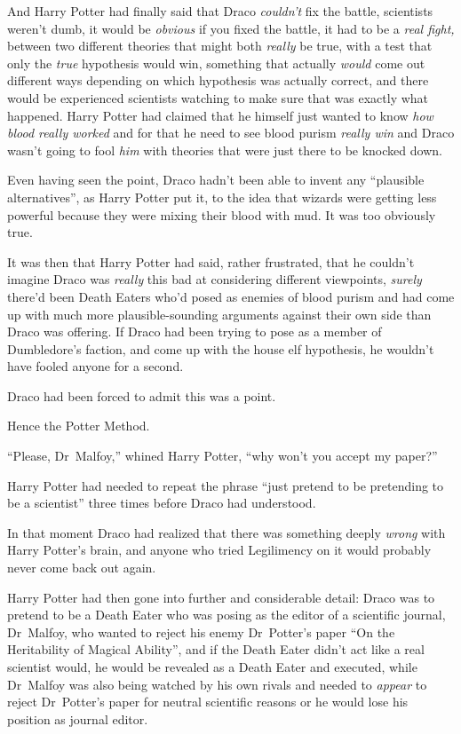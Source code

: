 And Harry Potter had finally said that Draco \emph{couldn’t} fix the battle, scientists weren’t dumb, it would be \emph{obvious} if you fixed the battle, it had to be a \emph{real fight,} between two different theories that might both \emph{really} be true, with a test that only the \emph{true} hypothesis would win, something that actually \emph{would} come out different ways depending on which hypothesis was actually correct, and there would be experienced scientists watching to make sure that was exactly what happened. Harry Potter had claimed that he himself just wanted to know \emph{how blood really worked} and for that he need to see blood purism \emph{really win} and Draco wasn’t going to fool \emph{him} with theories that were just there to be knocked down.

Even having seen the point, Draco hadn’t been able to invent any “plausible alternatives”, as Harry Potter put it, to the idea that wizards were getting less powerful because they were mixing their blood with mud. It was too obviously true.

It was then that Harry Potter had said, rather frustrated, that he couldn’t imagine Draco was \emph{really} this bad at considering different viewpoints, \emph{surely} there’d been Death Eaters who’d posed as enemies of blood purism and had come up with much more plausible-sounding arguments against their own side than Draco was offering. If Draco had been trying to pose as a member of Dumbledore’s faction, and come up with the house elf hypothesis, he wouldn’t have fooled anyone for a second.

Draco had been forced to admit this was a point.

Hence the Potter Method.

“Please, Dr~Malfoy,” whined Harry Potter, “why won’t you accept my paper?”

Harry Potter had needed to repeat the phrase “just pretend to be pretending to be a scientist” three times before Draco had understood.

In that moment Draco had realized that there was something deeply \emph{wrong} with Harry Potter’s brain, and anyone who tried Legilimency on it would probably never come back out again.

Harry Potter had then gone into further and considerable detail: Draco was to pretend to be a Death Eater who was posing as the editor of a scientific journal, Dr~Malfoy, who wanted to reject his enemy Dr~Potter’s paper “On the Heritability of Magical Ability”, and if the Death Eater didn’t act like a real scientist would, he would be revealed as a Death Eater and executed, while Dr~Malfoy was also being watched by his own rivals and needed to \emph{appear} to reject Dr~Potter’s paper for neutral scientific reasons or he would lose his position as journal editor.

